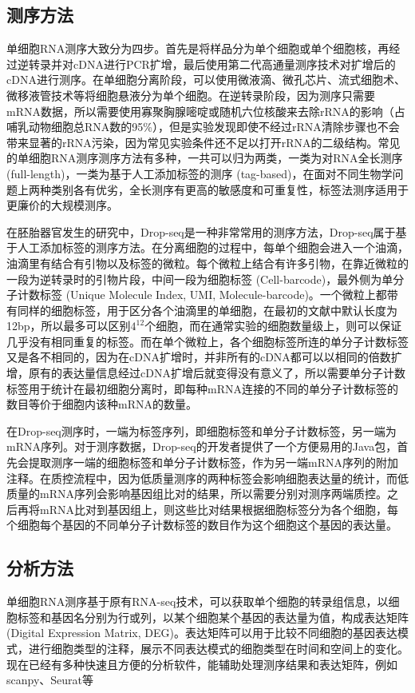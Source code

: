 \documentclass[lang=cn]{elegantpaper}
\begin{document}
\subsection{测序方法}
单细胞RNA测序大致分为四步。首先是将样品分为单个细胞或单个细胞核，再经过逆转录并对cDNA进行PCR扩增，最后使用第二代高通量测序技术对扩增后的cDNA进行测序。在单细胞分离阶段，可以使用微液滴、微孔芯片、流式细胞术、微移液管技术等将细胞悬液分为单个细胞\citep{hedlund_single-cell_2018}。在逆转录阶段，因为测序只需要mRNA数据，所以需要使用寡聚胸腺嘧啶或随机六位核酸来去除rRNA的影响（占哺乳动物细胞总RNA数的95\%），但是实验发现即使不经过rRNA清除步骤也不会带来显著的rRNA污染，因为常见实验条件还不足以打开rRNA的二级结构\citep{fan_single-cell_2015}。常见的单细胞RNA测序测序方法有多种，一共可以归为两类，一类为对RNA全长测序 (full-length)，一类为基于人工添加标签的测序 (tag-based)，在面对不同生物学问题上两种类别各有优劣，全长测序有更高的敏感度和可重复性，标签法测序适用于更廉价的大规模测序\citep{ziegenhain_comparative_2017}。

在胚胎器官发生的研究中，Drop-seq\citep{macosko_highly_2015}是一种非常常用的测序方法，Drop-seq属于基于人工添加标签的测序方法。在分离细胞的过程中，每单个细胞会进入一个油滴，油滴里有结合有引物以及标签的微粒。每个微粒上结合有许多引物，在靠近微粒的一段为逆转录时的引物片段，中间一段为细胞标签 (Cell-barcode)，最外侧为单分子计数标签 (Unique Molecule Index, UMI, Molecule-barcode)。一个微粒上都带有同样的细胞标签，用于区分各个油滴里的单细胞，在最初的文献中默认长度为12bp，所以最多可以区别$4^{12}$个细胞，而在通常实验的细胞数量级上，则可以保证几乎没有相同重复的标签。而在单个微粒上，各个细胞标签所连的单分子计数标签又是各不相同的，因为在cDNA扩增时，并非所有的cDNA都可以以相同的倍数扩增，原有的表达量信息经过cDNA扩增后就变得没有意义了，所以需要单分子计数标签用于统计在最初细胞分离时，即每种mRNA连接的不同的单分子计数标签的数目等价于细胞内该种mRNA的数量。

在Drop-seq测序时，一端为标签序列，即细胞标签和单分子计数标签，另一端为mRNA序列。对于测序数据，Drop-seq的开发者提供了一个方便易用的Java包，首先会提取测序一端的细胞标签和单分子计数标签，作为另一端mRNA序列的附加注释。在质控流程中，因为低质量测序的两种标签会影响细胞表达量的统计，而低质量的mRNA序列会影响基因组比对的结果，所以需要分别对测序两端质控。之后再将mRNA比对到基因组上，则这些比对结果根据细胞标签分为各个细胞，每个细胞每个基因的不同单分子计数标签的数目作为这个细胞这个基因的表达量。

\subsection{分析方法}
单细胞RNA测序基于原有RNA-seq技术，可以获取单个细胞的转录组信息，以细胞标签和基因名分别为行或列，以某个细胞某个基因的表达量为值，构成表达矩阵 (Digital Expression Matrix, DEG)。表达矩阵可以用于比较不同细胞的基因表达模式，进行细胞类型的注释，展示不同表达模式的细胞类型在时间和空间上的变化\citep{potter_single-cell_2018}。现在已经有多种快速且方便的分析软件，能辅助处理测序结果和表达矩阵\citep{bacher_design_2016}，例如scanpy\citep{wolf_scanpy_2018}、Seurat\citep{stuart_comprehensive_2019}等
\end{document}
